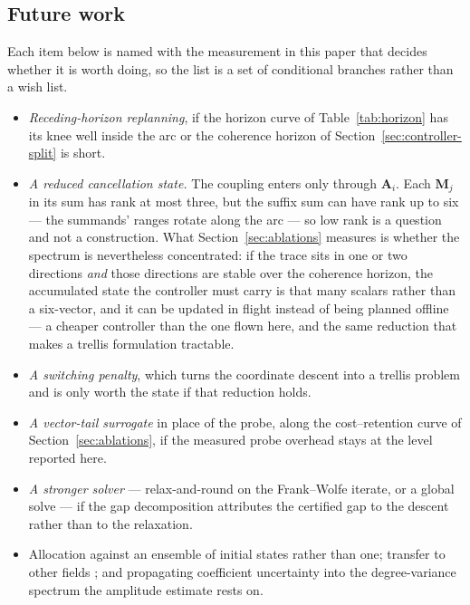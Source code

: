 \subsection{Future work}

 Each item below is named with the measurement in this
paper that decides whether it is worth doing, so the list is a set of
conditional branches rather than a wish list.

\begin{itemize}
  \item \emph{Receding-horizon replanning}, if the horizon curve of
    Table~\ref{tab:horizon} has its knee well inside the arc or the coherence
    horizon of Section~\ref{sec:controller-split} is short.
  \item \emph{A reduced cancellation state.} The coupling enters only through
    $\mathbf A_i$. Each $\mathbf M_j$ in its sum has rank at most three, but
    the suffix sum can have rank up to six --- the summands' ranges rotate
    along the arc --- so low rank is a question and not a construction. What
    Section~\ref{sec:ablations} measures is whether the spectrum is
    nevertheless concentrated: if the trace sits in one or two directions
    \emph{and} those directions are stable over the coherence horizon, the
    accumulated state the controller must carry is that many scalars rather
    than a six-vector, and it can be updated in flight instead of being
    planned offline --- a cheaper controller than the one flown here, and the
    same reduction that makes a trellis formulation tractable.
  \item \emph{A switching penalty}, which turns the coordinate descent into a
    trellis problem and is only worth the state if that reduction holds.
  \item \emph{A vector-tail surrogate} in place of the probe, along the
    cost--retention curve of Section~\ref{sec:ablations}, if the measured probe
    overhead stays at the level reported here.
  \item \emph{A stronger solver} --- relax-and-round on the Frank--Wolfe
    iterate, or a global solve --- if the gap decomposition attributes the
    certified gap to the descent rather than to the relaxation.
  \item Allocation against an ensemble of initial states rather than one;
    transfer to other fields \citep{konopliv2016mars}; and propagating
    coefficient uncertainty into the degree-variance spectrum the amplitude
    estimate rests on.
\end{itemize}
